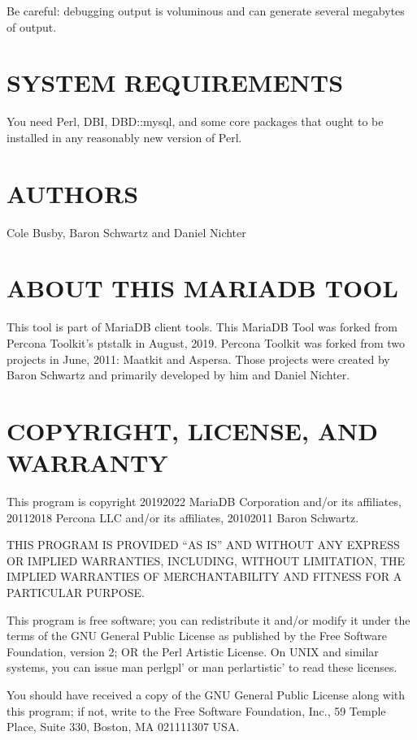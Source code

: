 \documentclass[letterpaper,10pt,english]{sphinxmanual}
\begin{document}
Be careful: debugging output is voluminous and can generate several megabytes
of output.


\section{SYSTEM REQUIREMENTS}
\label{\detokenize{mariadb-kill:system-requirements}}
You need Perl, DBI, DBD::mysql, and some core packages that ought to be
installed in any reasonably new version of Perl.


\section{AUTHORS}
\label{\detokenize{mariadb-kill:authors}}
Cole Busby, Baron Schwartz and Daniel Nichter


\section{ABOUT THIS MARIADB TOOL}
\label{\detokenize{mariadb-kill:about-this-mariadb-tool}}
This tool is part of MariaDB client tools. This MariaDB Tool was forked from
Percona Toolkit’s pt\sphinxhyphen{}stalk in August, 2019. Percona Toolkit was forked from two
projects in June, 2011: Maatkit and Aspersa.  Those projects were created by
Baron Schwartz and primarily developed by him and Daniel Nichter.


\section{COPYRIGHT, LICENSE, AND WARRANTY}
\label{\detokenize{mariadb-kill:copyright-license-and-warranty}}
This program is copyright 2019\sphinxhyphen{}2022 MariaDB Corporation and/or its affiliates,
2011\sphinxhyphen{}2018 Percona LLC and/or its affiliates, 2010\sphinxhyphen{}2011 Baron Schwartz.

THIS PROGRAM IS PROVIDED “AS IS” AND WITHOUT ANY EXPRESS OR IMPLIED
WARRANTIES, INCLUDING, WITHOUT LIMITATION, THE IMPLIED WARRANTIES OF
MERCHANTABILITY AND FITNESS FOR A PARTICULAR PURPOSE.

This program is free software; you can redistribute it and/or modify it under
the terms of the GNU General Public License as published by the Free Software
Foundation, version 2; OR the Perl Artistic License.  On UNIX and similar
systems, you can issue \textasciigrave{}man perlgpl’ or \textasciigrave{}man perlartistic’ to read these
licenses.

You should have received a copy of the GNU General Public License along with
this program; if not, write to the Free Software Foundation, Inc., 59 Temple
Place, Suite 330, Boston, MA  02111\sphinxhyphen{}1307  USA.
\end{document}
